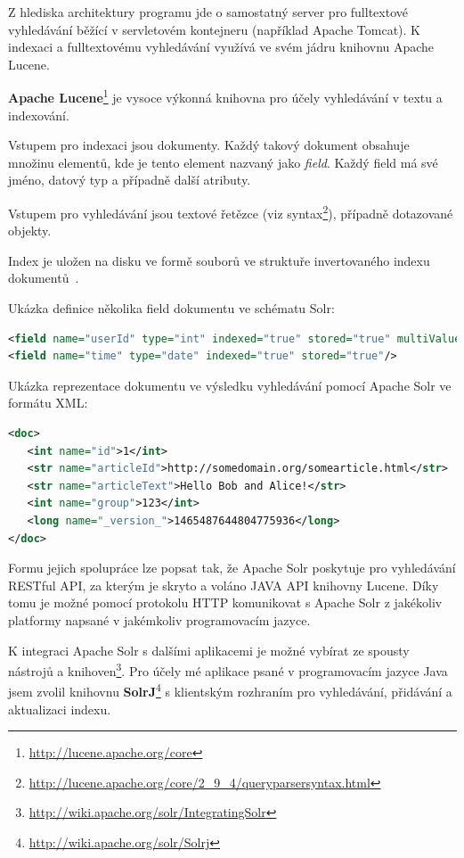 \documentclass[thesis=M,czech]{FITthesis}[2014/05/07]
\begin{document}
Z hlediska architektury programu jde o samostatný server pro fulltextové vyhledávání běžící v servletovém kontejneru (například Apache Tomcat). K indexaci a fulltextovému vyhledávání využívá ve svém jádru knihovnu Apache Lucene. 

\textbf{Apache Lucene}\footnote{\url{http://lucene.apache.org/core}} je vysoce výkonná knihovna pro účely vyhledávání v textu a indexování.

Vstupem pro indexaci jsou dokumenty. Každý takový dokument obsahuje množinu elementů, kde je tento element nazvaný jako \emph{field}. Každý field má své jméno, datový typ a případně další atributy.

Vstupem pro vyhledávání jsou textové řetězce (viz syntax\footnote{\url{http://lucene.apache.org/core/2_9_4/queryparsersyntax.html}}), případně dotazované objekty.

Index je uložen na disku ve formě souborů ve struktuře invertovaného indexu dokumentů~\cite{wiki:invindex}.

Ukázka definice několika field dokumentu ve schématu Solr:

\begin{lstlisting}[language=xml]
<field name="userId" type="int" indexed="true" stored="true" multiValued="true"/>	
<field name="time" type="date" indexed="true" stored="true"/>
\end{lstlisting}

Ukázka reprezentace dokumentu ve výsledku vyhledávání pomocí Apache Solr ve formátu XML:

\begin{lstlisting}[language=xml]
<doc>
   <int name="id">1</int>
   <str name="articleId">http://somedomain.org/somearticle.html</str>
   <str name="articleText">Hello Bob and Alice!</str>
   <int name="group">123</int>
   <long name="_version_">1465487644804775936</long>      
</doc>
\end{lstlisting}

Formu jejich spolupráce lze popsat tak, že Apache Solr poskytuje pro vyhledávání RESTful API, za kterým je skryto a voláno JAVA API knihovny Lucene. Díky tomu je možné pomocí protokolu HTTP komunikovat s Apache Solr z jakékoliv platformy napsané v jakémkoliv programovacím jazyce. 

K integraci Apache Solr s dalšími aplikacemi je možné vybírat ze spousty nástrojů a knihoven\footnote{\url{http://wiki.apache.org/solr/IntegratingSolr}}. Pro účely mé aplikace psané v programovacím jazyce Java jsem zvolil knihovnu \textbf{SolrJ}\footnote{\url{http://wiki.apache.org/solr/Solrj}} s klientským rozhraním pro vyhledávání, přidávání a aktualizaci indexu. 
\end{document}
